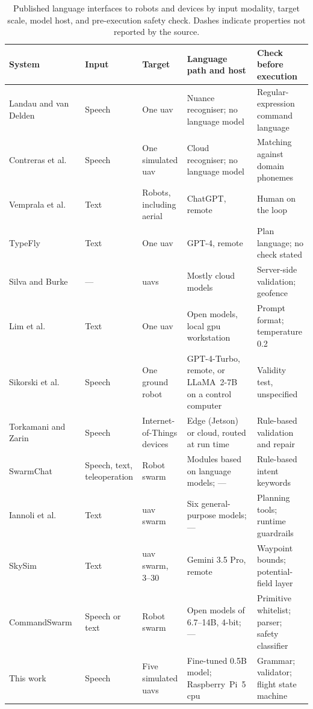 \begin{table}[htbp]
\centering
\footnotesize
\caption[Published language interfaces to robots]{Published language interfaces to robots and devices by input modality, target scale, model host, and pre-execution safety check. Dashes indicate properties not reported by the source.}
\label{tab:voice-uav-survey}
\begin{tabularx}{\textwidth}{@{}>{\raggedright\arraybackslash}p{2.5cm} >{\raggedright\arraybackslash}p{1.7cm} >{\raggedright\arraybackslash}p{2.0cm} >{\raggedright\arraybackslash}X >{\raggedright\arraybackslash}X@{}}
\toprule
System & Input & Target & Language path and host & Check before execution \\
\midrule
Landau and van Delden~\cite{landau2017} & Speech & One \gls{uav} & Nuance recogniser; no language model & Regular-expression command language \\
Contreras et al.~\cite{contreras2020} & Speech & One simulated \gls{uav} & Cloud recogniser; no language model & Matching against domain phonemes \\
Vemprala et al.~\cite{chatgptrobotics2024} & Text & Robots, including aerial & ChatGPT, remote & Human on the loop \\
TypeFly~\cite{typefly2024} & Text & One \gls{uav} & GPT-4, remote & Plan language; no check stated \\
Silva and Burke~\cite{silva2026} & --- & \glspl{uav} & Mostly cloud models & Server-side validation; geofence \\
Lim et al.~\cite{lim2025} & Text & One \gls{uav} & Open models, local \gls{gpu} workstation & Prompt format; temperature 0.2 \\
Sikorski et al.~\cite{sikorski2025} & Speech & One ground robot & GPT-4-Turbo, remote, or LLaMA~2-7B on a control computer & Validity test, unspecified \\
Torkamani and Zarin~\cite{torkamani2025} & Speech & Internet-of-Things devices & Edge (Jetson) or cloud, routed at run time & Rule-based validation and repair \\
SwarmChat~\cite{swarmchat2025} & Speech, text, teleoperation & Robot swarm & Modules based on language models; --- & Rule-based intent keywords \\
Iannoli et al.~\cite{iannoli2026} & Text & \gls{uav} swarm & Six general-purpose models; --- & Planning tools; runtime guardrails \\
SkySim~\cite{skysim2026} & Text & \gls{uav} swarm, 3--30 & Gemini 3.5 Pro, remote & Waypoint bounds; potential-field layer \\
Command\-Swarm~\cite{commandswarm2026} & Speech or text & Robot swarm & Open models of 6.7--14B, 4-bit; --- & Primitive whitelist; parser; safety classifier \\
\midrule
This work & Speech & Five simulated \glspl{uav} & Fine-tuned 0.5B model; Raspberry~Pi~5 \gls{cpu} & Grammar; validator; flight state machine \\
\bottomrule
\end{tabularx}
\end{table}


